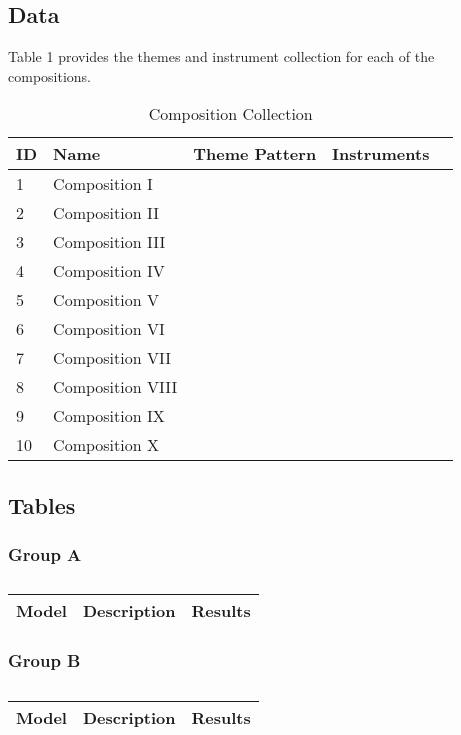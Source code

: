\subsection{Data}

Table 1 provides the themes and instrument collection for each of the compositions.
	
\begin{table}[H]
\caption{Composition Collection}	
\begin{tabular}{p{1cm}p{4cm}p{2cm}p{1cm}p{1cm}}
\hline
ID & Name & Theme Pattern & Instruments & \\
\hline 
1 & Composition I &  &  & \\
2 & Composition II &  &  & \\
3 & Composition III &  & \\
4 & Composition IV & & \\
5 & Composition V & & & \\
\hline 
6 & Composition VI &  &  & \\
7 & Composition VII &  &  & \\
8 & Composition VIII &  & \\
9 & Composition IX & & \\
10 & Composition X & & & \\
\end{tabular}
\end{table}

\subsection{Tables}

\subsubsection{Group A}

\centering	
\begin{table}[H]\tiny
	\caption{}	
	\begin{tabular}{r|p{4cm}|l}
		\hline	
		Model & Description & Results \\
		\hline 
		\hline 
	\end{tabular}
\end{table}

\subsubsection{Group B}

\centering	
\begin{table}[H]\tiny
	\caption{}	
	\begin{tabular}{r|p{4cm}|l}
		\hline	
		Model & Description & Results \\
		\hline 
		\hline 
	\end{tabular}
\end{table}

